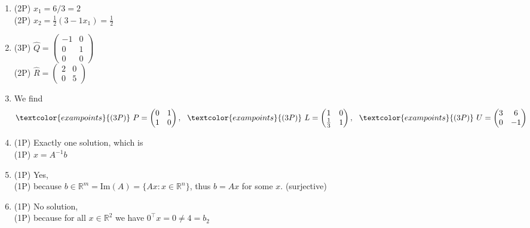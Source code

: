 {\color{solution}
\begin{enumerate}
	\item \textcolor{exampoints}{(2P)}  $x_1 = 6/3 = 2$\\
	\textcolor{exampoints}{(2P)} 
	$x_2 = \frac{1}{2}(3 - 1x_1) =  \frac{1}{2}$
	\item \textcolor{exampoints}{(3P)}
	$\widehat{Q} = \begin{pmatrix}
	 -1&0\\0&1\\0&0
	\end{pmatrix}$\\
 \textcolor{exampoints}{(2P)}	$\widehat{R}= \begin{pmatrix}
	2 & 0\\0&5
\end{pmatrix} $
\item We find
$$\textcolor{exampoints}{(3P)}~P = \begin{pmatrix}
0 & 1\\
1 & 0
\end{pmatrix},~~ \textcolor{exampoints}{(3P)}~L=\begin{pmatrix}
1 & 0\\
\frac{1}{3} & 1
\end{pmatrix},~~ \textcolor{exampoints}{(3P)} ~U=\begin{pmatrix}
3 & 6\\
0 & -1
\end{pmatrix}
$$
\item \textcolor{exampoints}{(1P)} Exactly one solution, which is \\ \textcolor{exampoints}{(1P)} $x=A^{-1}b$
\item \textcolor{exampoints}{(1P)} Yes,  \\
\textcolor{exampoints}{(1P)} because $b \in\mathbb{R}^m=\text{Im}(A)=\{Ax: x\in\mathbb{R}^n\}$, thus $b=Ax$ for some $x$. (surjective)
\item \textcolor{exampoints}{(1P)} No solution, \\
\textcolor{exampoints}{(1P)} because for all  $x\in\mathbb{R}^2$ we have $0^\top x = 0 \neq 4 = b_2$
\end{enumerate}
}

